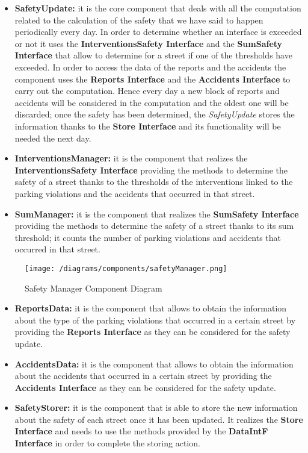 			\begin{itemize}
				\item \textbf{SafetyUpdate:} it is the core component that deals with all the computation related to the calculation of the safety that we have said to happen periodically every day. In order to determine whether an interface is exceeded or not it uses the \textbf{InterventionsSafety Interface} and the \textbf{SumSafety Interface} that allow to determine for a street if one of the thresholds have exceeded. In order to access the data of the reports and the accidents the component uses the \textbf{Reports Interface} and the \textbf{Accidents Interface} to carry out the computation. Hence every day a new block of reports and accidents will be considered in the computation and the oldest one will be discarded; once the safety has been determined, the \emph{SafetyUpdate} stores the information thanks to the \textbf{Store Interface} and its functionality will be needed the next day.
				
				\item \textbf{InterventionsManager:} it is the component that realizes the \textbf{InterventionsSafety Interface} providing the methods to determine the safety of a street thanks to the thresholds of the interventions linked to the parking violations and the accidents that occurred in that street.
				
				\item \textbf{SumManager:} it is the component that realizes the \textbf{SumSafety Interface} providing the methods to determine the safety of a street thanks to its sum threshold; it counts the number of parking violations and accidents that occurred in that street.
			\end{itemize}
		
			\begin{figure}[ht]
				\centering
				\texttt{[image: /diagrams/components/safetyManager.png]}
				\caption{\label{fig:safetyManagerComp} Safety Manager Component Diagram}
			\end{figure}
		
			\begin{itemize}
				\item \textbf{ReportsData:} it is the component that allows to obtain the information about the type of the parking violations that occurred in a certain street by providing the \textbf{Reports Interface} as they can be considered for the safety update.
				
				\item \textbf{AccidentsData:} it is the component that allows to obtain the information about the accidents that occurred in a certain street by providing the \textbf{Accidents Interface} as they can be considered for the safety update.
				
				\item \textbf{SafetyStorer:} it is the component that is able to store the new information about the safety of each street once it has been updated. It realizes the \textbf{Store Interface} and needs to use the methods provided by the \textbf{DataIntF Interface} in order to complete the storing action.
			\end{itemize}
		
